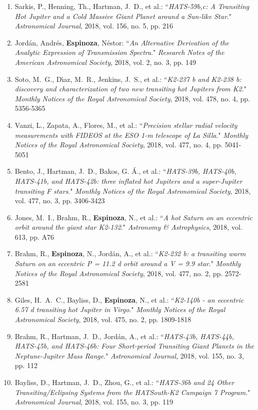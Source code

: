 \documentclass[12pt, a4paper]{article} %
\begin{document}
\begin{flushleft}
\begin{enumerate}
\item Sarkis, P., Henning, Th., Hartman, J.~D., et al.: ``\textit{HATS-59b,c: A Transiting Hot Jupiter and a Cold Massive Giant Planet around a Sun-like Star}." \textit{Astronomical Journal}, 2018, vol. 156, no. 5, pp. 216
\item Jordán, Andrés, \textbf{Espinoza}, Néstor: ``\textit{An Alternative Derivation of the Analytic Expression of Transmission Spectra}." \textit{Research Notes of the American Astronomical Society}, 2018, vol. 2, no. 3, pp. 149
\item Soto, M.~G., Dı́az, M.~R., Jenkins, J.~S., et al.: ``\textit{K2-237 b and K2-238 b: discovery and characterization of two new transiting hot Jupiters from K2}." \textit{Monthly Notices of the Royal Astronomical Society}, 2018, vol. 478, no. 4, pp. 5356-5365
\item Vanzi, L., Zapata, A., Flores, M., et al.: ``\textit{Precision stellar radial velocity measurements with FIDEOS at the ESO 1-m telescope of La Silla}." \textit{Monthly Notices of the Royal Astronomical Society}, 2018, vol. 477, no. 4, pp. 5041-5051
\item Bento, J., Hartman, J.~D., Bakos, G. Á., et al.: ``\textit{HATS-39b, HATS-40b, HATS-41b, and HATS-42b: three inflated hot Jupiters and a super-Jupiter transiting F stars}." \textit{Monthly Notices of the Royal Astronomical Society}, 2018, vol. 477, no. 3, pp. 3406-3423
\item Jones, M.~I., Brahm, R., \textbf{Espinoza}, N., et al.: ``\textit{A hot Saturn on an eccentric orbit around the giant star K2-132}." \textit{Astronomy \& Astrophysics}, 2018, vol. 613, pp. A76
\item Brahm, R., \textbf{Espinoza}, N., Jordán, A., et al.: ``\textit{K2-232 b: a transiting warm Saturn on an eccentric P = 11.2 d orbit around a V = 9.9 star}." \textit{Monthly Notices of the Royal Astronomical Society}, 2018, vol. 477, no. 2, pp. 2572-2581
\item Giles, H.~A.~C., Bayliss, D., \textbf{Espinoza}, N., et al.: ``\textit{K2-140b - an eccentric 6.57 d transiting hot Jupiter in Virgo}." \textit{Monthly Notices of the Royal Astronomical Society}, 2018, vol. 475, no. 2, pp. 1809-1818
\item Brahm, R., Hartman, J.~D., Jordán, A., et al.: ``\textit{HATS-43b, HATS-44b, HATS-45b, and HATS-46b: Four Short-period Transiting Giant Planets in the Neptune-Jupiter Mass Range}." \textit{Astronomical Journal}, 2018, vol. 155, no. 3, pp. 112
\item Bayliss, D., Hartman, J.~D., Zhou, G., et al.: ``\textit{HATS-36b and 24 Other Transiting/Eclipsing Systems from the HATSouth-K2 Campaign 7 Program}." \textit{Astronomical Journal}, 2018, vol. 155, no. 3, pp. 119

\end{enumerate}
\end{flushleft}
\end{document}
